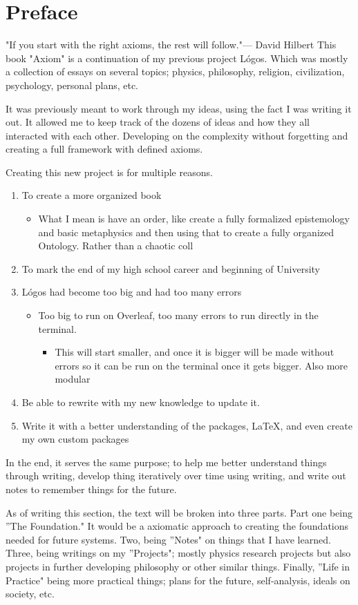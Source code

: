 \chapter{Preface}
"If you start with the right axioms, the rest will follow."— David Hilbert
\singlespacing 
This book "Axiom" is a continuation of my previous project Lógos. Which was mostly a collection of essays on several topics; physics, philosophy, religion, civilization, psychology, personal plans, etc.

It was previously meant to work through my ideas, using the fact I was writing it out. It allowed me to keep track of the dozens of ideas and how they all interacted with each other. Developing on the complexity without forgetting and creating a full framework with defined axioms. 

Creating this new project is for multiple reasons. 
\begin{enumerate}
    \item To create a more organized book
    \begin{itemize}
        \item What I mean is have an order, like create a fully formalized epistemology and basic metaphysics and then using that to create a fully organized Ontology. Rather than a chaotic coll
    \end{itemize}
    \item To mark the end of my high school career and beginning of University
    \item Lógos had become too big and had too many errors
    \begin{itemize}
        \item Too big to run on Overleaf, too many errors to run directly in the terminal. 
        \begin{itemize}
            \item This will start smaller, and once it is bigger will be made without errors so it can be run on the terminal once it gets bigger. Also more modular 
    \end{itemize}
    \end{itemize}
    \item Be able to rewrite with my new knowledge to update it.
    \item Write it with a better understanding of the packages, LaTeX, and even create my own custom packages
\end{enumerate}
In the end, it serves the same purpose; to help me better understand things through writing, develop thing iteratively over time using writing, and write out notes to remember things for the future.

As of writing this section, the text will be broken into three parts. Part one being ''The Foundation." It would be a axiomatic approach to creating the foundations needed for future systems. Two, being ''Notes" on things that I have learned. Three, being writings on my ''Projects"; mostly physics research projects but also projects in further developing philosophy or other similar things. Finally, ''Life in Practice" being more practical things; plans for the future, self-analysis, ideals on society, etc.
